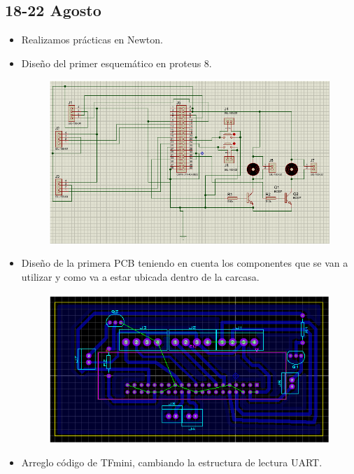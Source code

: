 \documentclass[12pt,a4paper]{article}
\begin{document}
\subsection*{18-22 Agosto}
\begin{itemize}
\item Realizamos prácticas en Newton.

\item Diseño del primer esquemático en proteus 8.

\begin{figure}[H]
    \centering
    \includegraphics[width=0.75\linewidth]{Carpeta de campo/Captura de pantalla (1).png}
\end{figure}

\item Diseño de la primera PCB teniendo en cuenta los componentes que se van a utilizar y como va a estar ubicada dentro de la carcasa.

\begin{figure}[H]
    \centering
    \includegraphics[width=0.75\linewidth]{Carpeta de campo/Captura de pantalla (2).png}
\end{figure}

\item Arreglo código de TFmini, cambiando la estructura de lectura UART.


\end{itemize}
\end{document}
